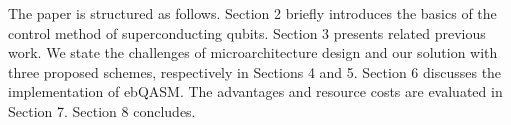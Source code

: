 The paper is structured as follows. Section 2 briefly introduces the basics of the control method of superconducting qubits. 
Section 3 presents related previous work. We state the challenges of microarchitecture design 
and our solution with three proposed schemes, respectively in Sections 4 and 5. 
Section 6 discusses the implementation of ebQASM. 
The advantages and resource costs are evaluated in Section 7. 
Section 8 concludes.